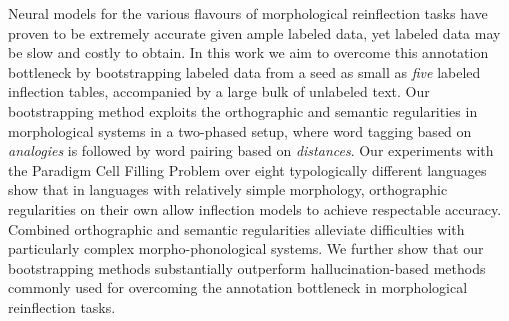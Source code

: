 Neural models for the various flavours of morphological reinflection tasks have proven to be extremely accurate given ample labeled data, yet labeled data may be slow and costly to obtain. In this work we aim to overcome this annotation bottleneck by bootstrapping labeled data from a seed as small as {\em five} labeled inflection tables, accompanied by a large bulk of unlabeled text. Our bootstrapping method exploits the orthographic and semantic regularities in morphological systems in a two-phased setup, where word tagging based on {\em analogies} is followed by word pairing based on {\em distances}. Our experiments with the Paradigm Cell Filling Problem over eight typologically different languages show that in languages with relatively simple morphology, orthographic regularities on their own allow inflection models to achieve respectable accuracy. Combined orthographic and semantic regularities alleviate difficulties with particularly complex morpho-phonological systems. We further show that our bootstrapping methods substantially outperform hallucination-based methods commonly used for overcoming the annotation bottleneck in morphological reinflection tasks.
